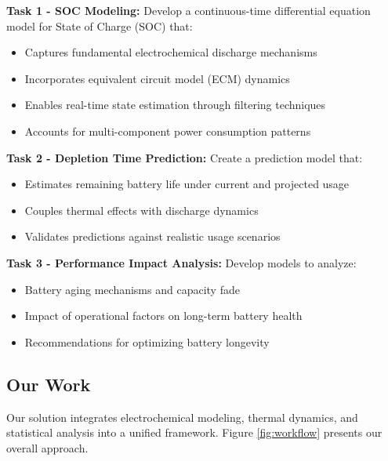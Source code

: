 \textbf{Task 1 - SOC Modeling:} Develop a continuous-time differential equation model for State of Charge (SOC) that:
\begin{itemize}[noitemsep]
    \item Captures fundamental electrochemical discharge mechanisms
    \item Incorporates equivalent circuit model (ECM) dynamics
    \item Enables real-time state estimation through filtering techniques
    \item Accounts for multi-component power consumption patterns
\end{itemize}

\textbf{Task 2 - Depletion Time Prediction:} Create a prediction model that:
\begin{itemize}[noitemsep]
    \item Estimates remaining battery life under current and projected usage
    \item Couples thermal effects with discharge dynamics
    \item Validates predictions against realistic usage scenarios
\end{itemize}

\textbf{Task 3 - Performance Impact Analysis:} Develop models to analyze:
\begin{itemize}[noitemsep]
    \item Battery aging mechanisms and capacity fade
    \item Impact of operational factors on long-term battery health
    \item Recommendations for optimizing battery longevity
\end{itemize}

\subsection{Our Work}

Our solution integrates electrochemical modeling, thermal dynamics, and statistical analysis into a unified framework. Figure \ref{fig:workflow} presents our overall approach.

